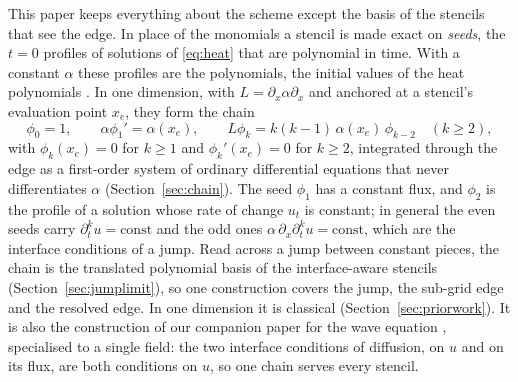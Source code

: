 \documentclass[11pt]{amsart}
\theoremstyle{definition}
\theoremstyle{remark}
\newcommand{\px}{\partial_x}
\begin{document}
This paper keeps everything about the scheme except the basis of the
stencils that see the edge. In place of the monomials a stencil is made
exact on \emph{seeds}, the $t = 0$ profiles of solutions of \eqref{eq:heat}
that are polynomial in time. With a constant $\alpha$ these profiles are
the polynomials, the initial values of the heat polynomials
\cite{RosenbloomWidder1959}. In one dimension, with $L = \px \alpha \px$
and anchored at a stencil's evaluation point $x_e$, they form the chain
\begin{equation}
  \label{eq:chain}
  \phi_0 = 1, \qquad
  \alpha \phi_1' = \alpha(x_e), \qquad
  L \phi_k = k (k - 1)\, \alpha(x_e)\, \phi_{k-2} \quad (k \ge 2),
\end{equation}
with $\phi_k(x_e) = 0$ for $k \ge 1$ and $\phi_k'(x_e) = 0$ for $k \ge 2$,
integrated through the edge as a first-order system of ordinary
differential equations that never differentiates $\alpha$
(Section~\ref{sec:chain}). The seed $\phi_1$ has a constant flux, and
$\phi_2$ is the profile of a solution whose rate of change $u_t$ is
constant; in general the even seeds carry
$\partial_t^k u = \text{const}$ and the odd ones
$\alpha\, \px \partial_t^k u = \text{const}$, which are the interface
conditions of a jump. Read across a jump between constant pieces, the
chain is the translated
polynomial basis of the interface-aware stencils
(Section~\ref{sec:jumplimit}), so one construction covers the jump, the
sub-grid edge and the resolved edge. In one dimension it is classical
(Section~\ref{sec:priorwork}). It is also the construction of our companion
paper for the wave equation \cite{Martin2026seeds}, specialised to a single
field: the two interface conditions of diffusion, on $u$ and on its flux,
are both conditions on $u$, so one chain serves every stencil.
\end{document}
